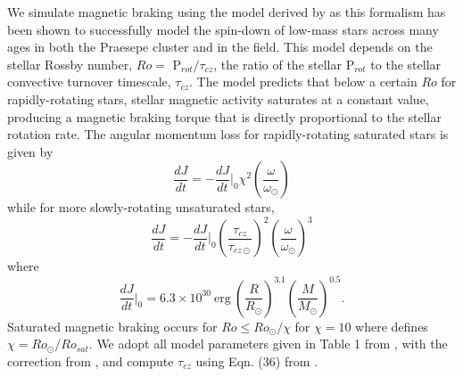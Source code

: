We simulate magnetic braking using the model derived by \citet{Matt2015} as this formalism has been shown to successfully model the spin-down of low-mass stars across many ages in both the Praesepe cluster and in the \kepler field. This model depends on the stellar Rossby number, $Ro = $ P$_{rot}/\tau_{cz}$, the ratio of the stellar P$_{rot}$ to the stellar convective turnover timescale, $\tau_{cz}$. The \citet{Matt2015} model predicts that below a certain $Ro$ for rapidly-rotating stars, stellar magnetic activity saturates at a constant value, producing a magnetic braking torque that is directly proportional to the stellar rotation rate.  The angular momentum loss for rapidly-rotating saturated stars is given by
\begin{equation} \label{sync:eqn:mattSat}
\frac{dJ}{dt} = -\frac{dJ}{dt}\Bigg|_0 \chi^2 \left( \frac{\omega}{\omega_{\odot}} \right) 
\end{equation}
while for more slowly-rotating unsaturated stars,
\begin{equation} \label{sync:eqn:mattUnSat}
\frac{dJ}{dt} = -\frac{dJ}{dt}\Bigg|_0 \left( \frac{\tau_{cz}}{\tau_{cz \odot}} \right)^2 \left( \frac{\omega}{\omega_{\odot}} \right)^3
\end{equation}
where
\begin{equation} \label{sync:eqn:matt0}
\frac{dJ}{dt}\Bigg|_0 = 6.3 \times 10^{30} \ \mathrm{erg} \ \left( \frac{R}{R_{\odot}} \right)^{3.1} \left( \frac{M}{M_{\odot}} \right)^{0.5}.
\end{equation}
Saturated magnetic braking occurs for $Ro \leq Ro_{\odot}/\chi$ for $\chi = 10$ where \citet{Matt2015} defines $\chi = Ro_{\odot}/Ro_{sat}$.  We adopt all model parameters given in Table 1 from \citet{Matt2015}, with the correction from \citet{Matt2019}, and compute $\tau_{cz}$ using Eqn. (36) from \citet{Cranmer2011}.


